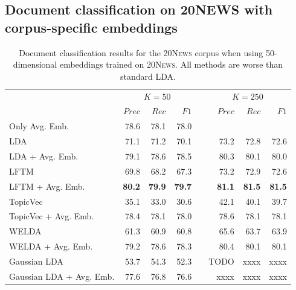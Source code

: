 \documentclass[
        a4paper,
        titlepage,
        twoside,
        parskip
        ]{scrbook}
\newcommand{\ra}[1]{\renewcommand{\arraystretch}{#1}}
\theoremstyle{break}
\begin{document}
\begin{appendices}
  \subsection{Document classification on 20N{\footnotesize EWS} with corpus-specific embeddings}
  \label{sec:appendix_document_classification_corpus_specific}
  \begin{table}[]
    \ra{1.3}
    \centering
    \caption{Document classification results for the \textsc{20News} corpus when using 50-dimensional embeddings trained on \textsc{20News}.
    All methods are worse than standard LDA.}
    \label{table:document_classification_dim-50}
    \begin{tabular}{lrrrcrrr}
      \toprule
      \multirow{2}{*}{} & \multicolumn{3}{c}{$K = 50$} & \phantom{a} & \multicolumn{3}{c}{$K = 250$} \\ \cmidrule{2-4} \cmidrule{6-8}
                        & $Prec$    & $Rec$     & $F1$     && $Prec$    & $Rec$   & $F1$     \\ \midrule
                        Only Avg. Emb.           & 78.6    & 78.1    & 78.0   && \multicolumn{3}{l}{}        \\
                        LDA                      & 71.1    & 71.2    & 70.1   && 73.2    & 72.8     & 72.6   \\
                        LDA + Avg. Emb.          & 79.1    & 78.6    & 78.5   && 80.3    & 80.1     & 80.0   \\
                        LFTM                     & 69.8    & 68.2    & 67.3   && 73.2    & 72.9     & 72.6   \\
                        LFTM + Avg. Emb.         & \textbf{80.2}    & \textbf{79.9}    & \textbf{79.7}   && \textbf{81.1}    & \textbf{81.5}     & \textbf{81.5}   \\
                        TopicVec                 & 35.1    & 33.0    & 30.6   && 42.1    & 40.1     & 39.7   \\
                        TopicVec + Avg. Emb.     & 78.4    & 78.1    & 78.0   && 78.6    & 78.1     & 78.1   \\
                        WELDA                    & 61.3    & 60.9    & 60.8   && 65.6    & 63.7     & 63.9   \\ %
                        WELDA + Avg. Emb.        & 79.2    & 78.6    & 78.3   && 80.4    & 80.1     & 80.1   \\
                        Gaussian LDA             & 53.7    & 54.3    & 52.3   && TODO    & xxxx     & xxxx   \\
                        Gaussian LDA + Avg. Emb. & 77.6    & 76.8    & 76.6   && xxxx    & xxxx     & xxxx   \\
    \bottomrule
    \end{tabular}
  \end{table}

\end{appendices}
\end{document}

